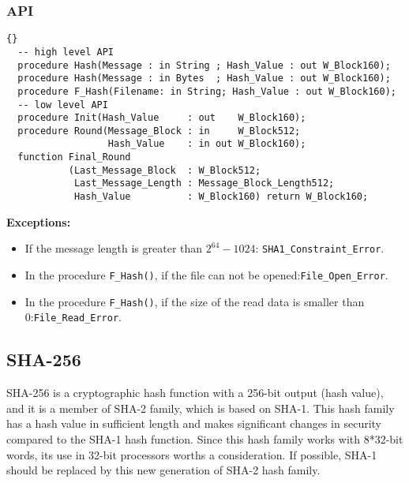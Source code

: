 \subsubsection*{API}
\begin{lstlisting}{}
  -- high level API
  procedure Hash(Message : in String ; Hash_Value : out W_Block160);
  procedure Hash(Message : in Bytes  ; Hash_Value : out W_Block160);
  procedure F_Hash(Filename: in String; Hash_Value : out W_Block160);
  -- low level API
  procedure Init(Hash_Value     : out    W_Block160);
  procedure Round(Message_Block : in     W_Block512;
                  Hash_Value    : in out W_Block160);
  function Final_Round
           (Last_Message_Block  : W_Block512;
            Last_Message_Length : Message_Block_Length512;
            Hash_Value          : W_Block160) return W_Block160;
\end{lstlisting}
\textbf{Exceptions:}
\begin{itemize}
\item If the message length is greater than $2^{64}-1024$:\quad
  \texttt{SHA1\_Constraint\_Error}.
\item In the procedure \texttt{F\_Hash()}, if the file can not be
  opened:\quad\texttt{File\_Open\_Error}.
 \item In the procedure \texttt{F\_Hash()}, if the size of the read
   data is smaller than 0:\quad\texttt{File\_Read\_Error}.
\end{itemize}

\subsection{SHA-256}
SHA-256 is a cryptographic hash function with a 256-bit output (hash
value), and it is a member of SHA-2 family, which is based on
SHA-1. This hash family has a hash value in sufficient length and
makes significant changes in security compared to the SHA-1 hash
function. Since this hash family works with 8*32-bit words, its use in
32-bit processors worths a consideration. If possible, SHA-1 should be
replaced by this new generation of SHA-2 hash family.
